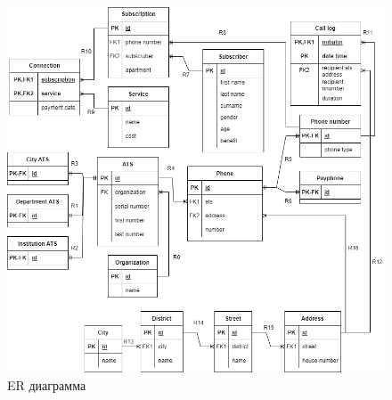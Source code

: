 \documentclass{report}
\begin{document}
\begin{figure}[!ht]
    \begin{center}
    \includegraphics[width=\textwidth]{resources/er.png}
    \caption{ER диаграмма}
    \end{center}
\end{figure}
\end{document}
